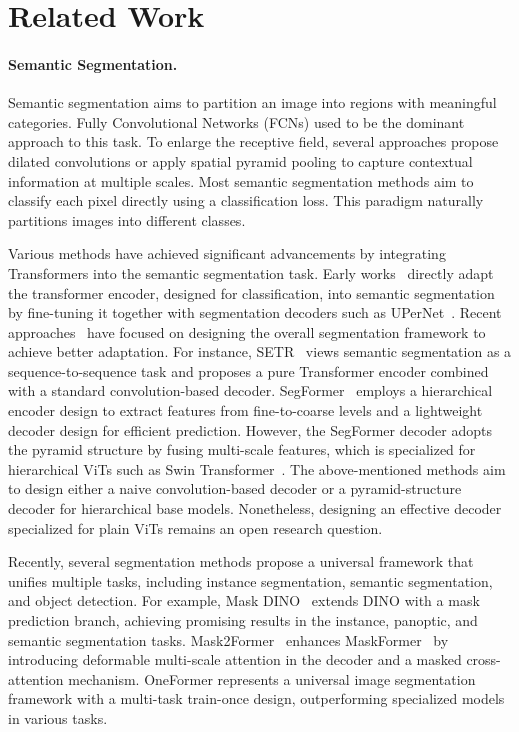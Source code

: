     




    
    


 
\section{Related Work}
\paragraph{Semantic Segmentation.}
Semantic segmentation aims to partition an image into regions with meaningful categories. Fully Convolutional Networks (FCNs) used to be the dominant approach to this task.
To enlarge the receptive field, several approaches \cite{pspnet, dv3} propose dilated convolutions or apply spatial pyramid pooling to capture contextual information at multiple scales.
 Most semantic segmentation methods aim to classify each pixel directly using a classification loss. This paradigm naturally partitions images into different classes. 

Various methods have achieved significant advancements by integrating Transformers into the semantic segmentation task. Early works~\cite{liu2021swin, dong2022cswin} directly adapt the transformer encoder, designed for classification, into semantic segmentation by fine-tuning it together with segmentation decoders such as UPerNet~\cite{Upernet}. Recent approaches~\cite{xie2021segformer, strudel2021segmenter, maskformer} have focused on designing the overall segmentation framework to achieve better adaptation. For instance, SETR~\cite{setr} views semantic segmentation as a sequence-to-sequence task and proposes a pure Transformer encoder combined with a standard convolution-based decoder. SegFormer~\cite{xie2021segformer} employs a hierarchical encoder design to extract features from fine-to-coarse levels and a lightweight decoder design for efficient prediction. However, the SegFormer decoder adopts the pyramid structure by fusing multi-scale features, which is specialized for hierarchical ViTs such as Swin Transformer~\cite{liu2021swin}. The above-mentioned methods aim to design either a naive convolution-based decoder or a pyramid-structure decoder for hierarchical base models.  Nonetheless, designing an effective decoder specialized for plain ViTs remains an open research question.


Recently, several segmentation methods propose a universal framework that unifies multiple tasks, including instance segmentation, semantic segmentation, and object detection.  For example, Mask DINO~\cite{li2022mask} extends DINO with a mask prediction branch, achieving promising results in the instance, panoptic, and semantic segmentation tasks. Mask2Former~\cite{cheng2021mask2former} enhances MaskFormer~\cite{maskformer} by introducing deformable multi-scale attention in the decoder and a masked cross-attention mechanism. OneFormer \cite{jain2022oneformer} represents a universal image segmentation framework with a multi-task train-once design, outperforming specialized models in various tasks.


